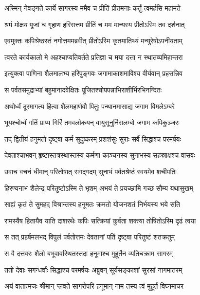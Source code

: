 \twolineshloka
{अस्मिन् नेवङ्गते कार्ये सागरस्य ममैव च}
{प्रीतिं प्रीतमनाः कर्तुं त्वमर्हसि महामते} %

\twolineshloka
{श्रमं मोक्षय पूजां च गृहाण हरिसत्तम}
{प्रीतिं च मम मान्यस्य प्रीतोऽस्मि तव दर्शनात्} %

\twolineshloka
{एवमुक्तः कपिश्रेष्ठस्तं नगोत्तममब्रवीत्}
{प्रीतोऽस्मि कृतमातिथ्यं मन्युरेषोऽपनीयताम्} %

\twolineshloka
{त्वरते कार्यकालो मे अहश्चाप्यतिवर्तते}
{प्रतिज्ञा च मया दत्ता न स्थातव्यमिहान्तरा} %

\twolineshloka
{इत्युक्त्वा पाणिना शैलमालभ्य हरिपुङ्गवः}
{जगामाकाशमाविश्य वीर्यवान् प्रहसन्निव} %

\twolineshloka
{स पर्वतसमुद्राभ्यां बहुमानादवेक्षितः}
{पूजितश्चोपपन्नाभिराशीर्भिरभिनन्दितः} %

\twolineshloka
{अथोर्ध्वं दूरमागत्य हित्वा शैलमहार्णवौ}
{पितुः पन्थानमासाद्य जगाम विमलेऽम्बरे} %

\twolineshloka
{भूयश्चोर्ध्वं गतिं प्राप्य गिरिं तमवलोकयन्}
{वायुसूनुर्निरालम्बो जगाम कपिकुञ्जरः} %

\twolineshloka
{तद् द्वितीयं हनुमतो दृष्ट्वा कर्म सुदुष्करम्}
{प्रशशंसुः सुराः सर्वे सिद्धाश्च परमर्षयः} %

\twolineshloka
{देवताश्चाभवन् हृष्टास्तत्रस्थास्तस्य कर्मणा}
{काञ्चनस्य सुनाभस्य सहस्राक्षश्च वासवः} %

\twolineshloka
{उवाच वचनं धीमान् परितोषात् सगद्गदम्}
{सुनाभं पर्वतश्रेष्ठं स्वयमेव शचीपतिः} %

\twolineshloka
{हिरण्यनाभ शैलेन्द्र परितुष्टोऽस्मि ते भृशम्}
{अभयं ते प्रयच्छामि गच्छ सौम्य यथासुखम्} %

\twolineshloka
{साह्यं कृतं ते सुमहद् विश्रान्तस्य हनूमतः}
{क्रमतो योजनशतं निर्भयस्य भये सति} %

\twolineshloka
{रामस्यैष हितायैव याति दाशरथेः कपिः}
{सत्क्रियां कुर्वता शक्त्या तोषितोऽस्मि दृढं त्वया} %

\twolineshloka
{स तत् प्रहर्षमलभद् विपुलं पर्वतोत्तमः}
{देवतानां पतिं दृष्ट्वा परितुष्टं शतक्रतुम्} %

\twolineshloka
{स वै दत्तवरः शैलो बभूवावस्थितस्तदा}
{हनूमांश्च मुहूर्तेन व्यतिचक्राम सागरम्} %

\twolineshloka
{ततो देवाः सगन्धर्वाः सिद्धाश्च परमर्षयः}
{अब्रुवन् सूर्यसङ्काशां सुरसां नागमातरम्} %

\twolineshloka
{अयं वातात्मजः श्रीमान् प्लवते सागरोपरि}
{हनूमान् नाम तस्य त्वं मुहूर्तं विघ्नमाचर} %

